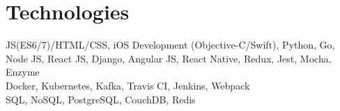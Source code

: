 \documentclass[]{friggeri-cv} %
\begin{document}

\section{Technologies}
{JS(ES6/7)/HTML/CSS, iOS Development (Objective-C/Swift), Python, Go, } \\
{Node JS, React JS, Django, Angular JS, React Native, Redux, Jest, Mocha, Enzyme} \\
{Docker, Kubernetes, Kafka, Travis CI, Jenkins, Webpack} \\
{SQL, NoSQL, PostgreSQL, CouchDB, Redis} \\
\end{document}
